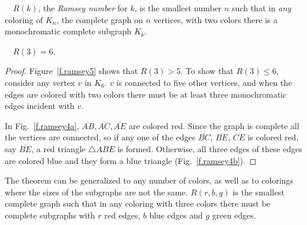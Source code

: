 \begin{definition}
$\quad R(k)$, the \emph{Ramsey number} for $k$, is the smallest number $n$ such that in \emph{any} coloring of $K_{n}$, the complete graph on $n$ vertices, with two colors there is a monochromatic complete subgraph $K_k$.
\end{definition}
\begin{theorem}[Ramsey]
$\quad R(3)=6$.\label{thm.ramsey}
\end{theorem}

\begin{proof}
Figure~\ref{f.ramsey5} shows that $R(3)>5$. To show that $R(3)\leq 6$, consider any vertex $v$ in $K_6$. $v$ is connected to five other vertices, and when the edges are colored with two colors there must be at least three monochromatic edges incident with $v$. 

In Fig.~\ref{f.ramsey4a}, $\overline{AB}, \overline{AC}, \overline{AE}$ are colored red. Since the graph is complete all the vertices are connected, so if any one of the edges $\overline{BC}$, $\overline{BE}$, $\overline{CE}$ is colored red, say $\overline{BE}$, a red triangle $\triangle ABE$ is formed. Otherwise, all three edges of these edges are colored blue and they form a blue triangle (Fig.~\ref{f.ramsey4b}).
\end{proof}

The theorem can be generalized to any number of colors, as well as to colorings where the sizes of the subgraphs are not the same. $R(r,b,g)$ is the smallest complete graph such that  in any coloring with three colors there must be complete subgraphs with $r$ red edges, $b$ blue edges and $g$ green edges.

